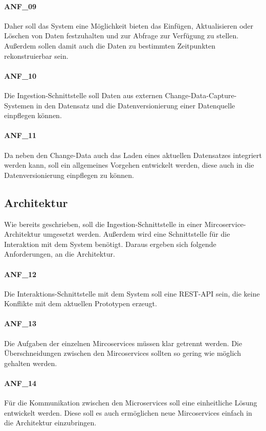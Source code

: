 \paragraph{ANF\_09}
\label{ANF_09}
Daher soll das System eine Möglichkeit bieten das Einfügen, Aktualisieren oder Löschen von Daten festzuhalten und zur Abfrage zur Verfügung zu stellen.
Außerdem sollen damit auch die Daten zu bestimmten Zeitpunkten rekonstruierbar sein.

\paragraph{ANF\_10}
\label{ANF_10}
Die Ingestion-Schnittstelle soll Daten aus externen Change-Data-Capture-Systemen in den Datensatz und die Datenversionierung einer Datenquelle einpflegen können.

\paragraph{ANF\_11}
\label{ANF_11}
Da neben den Change-Data auch das Laden eines aktuellen Datensatzes integriert werden kann, soll ein allgemeines Vorgehen entwickelt werden, diese auch in die Datenversionierung einpflegen zu können.

\subsection{Architektur}
Wie bereits geschrieben, soll die Ingestion-Schnittstelle in einer Mircoservice-Architektur umgesetzt werden.
Außerdem wird eine Schnittstelle für die Interaktion mit dem System benötigt.
Daraus ergeben sich folgende Anforderungen, an die Architektur.

\paragraph{ANF\_12}
\label{ANF_12}
Die Interaktions-Schnittstelle mit dem System soll eine REST-API sein, die keine Konflikte mit dem aktuellen Prototypen erzeugt.

\paragraph{ANF\_13}
\label{ANF_13}
Die Aufgaben der einzelnen Mircoservices müssen klar getrennt werden.
Die Überschneidungen zwischen den Mircoservices sollten so gering wie möglich gehalten werden.

\paragraph{ANF\_14}
\label{ANF_14}
Für die Kommunikation zwischen den Microservices soll eine einheitliche Lösung entwickelt werden.
Diese soll es auch ermöglichen neue Mircoservices einfach in die Architektur einzubringen.

